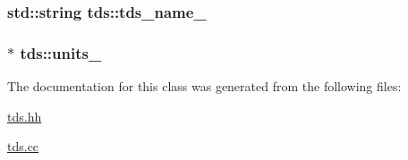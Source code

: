 \hypertarget{classtds_a81d050e8f4824b068943233983a18c72}{
\subsubsection[{tds\-\_\-name\-\_\-}]{\setlength{\rightskip}{0pt plus 5cm}std\-::string tds\-::tds\-\_\-name\-\_\-\hspace{0.3cm}{\ttfamily [protected]}}}\label{classtds_a81d050e8f4824b068943233983a18c72}
\hypertarget{classtds_a995cf6b41f841a319beee5956ee3092a}{
\subsubsection[{units\-\_\-}]{$\ast$ tds\-::units\-\_\-\hspace{0.3cm}{\ttfamily [protected]}}}\label{classtds_a995cf6b41f841a319beee5956ee3092a}


The documentation for this class was generated from the following files\-:\begin{DoxyCompactItemize}
\item 
\hyperlink{tds_8hh}{tds.\-hh}\item 
\hyperlink{tds_8cc}{tds.\-cc}\end{DoxyCompactItemize}
